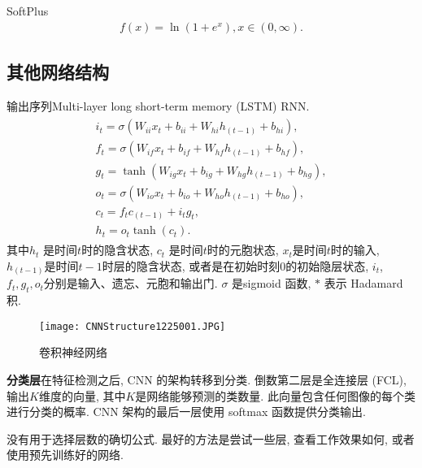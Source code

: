 SoftPlus \cite{glorot2011}
\begin{align}
    f (x)=\ln \left (1+e^{x}\right), x\in (0, \infty).
\end{align}
\subsection{其他网络结构}
输出序列Multi-layer long short-term memory (LSTM) RNN.
\begin{align}
\begin{array}{l}
{i_{t}=\sigma\left (W_{i i} x_{t}+b_{i i}+W_{h i} h_{ (t-1)}+b_{h i}\right)}, \\
{f_{t}=\sigma\left (W_{i f} x_{t}+b_{i f}+W_{h f} h_{ (t-1)}+b_{h f}\right)}, \\
{g_{t}=\tanh \left (W_{i g} x_{t}+b_{i g}+W_{h g} h_{ (t-1)}+b_{h g}\right)}, \\
{o_{t}=\sigma\left (W_{i o} x_{t}+b_{i o}+W_{h o} h_{ (t-1)}+b_{h o}\right)}, \\
{c_{t}=f_{t}  c_{ (t-1)}+i_{t}  g_{t}}, \\
{h_{t}=o_{t}  \tanh \left (c_{t}\right)}.
\end{array}
\end{align}
其中$h_t$ 是时间$t$时的隐含状态, $c_t$ 是时间$t$时的元胞状态, $x_t$是时间$t$时的输入, $h_{(t-1)}$是时间$t-1$时层的隐含状态, 或者是在初始时刻0的初始隐层状态,
$i_t$, $f_t, g_t, o_t$分别是输入、遗忘、元胞和输出门. $\sigma$ 是sigmoid 函数, $*$ 表示 Hadamard 积. 
\begin{figure}[H]
\centering
\texttt{[image: CNNStructure1225001.JPG]}
\vspace{-0.2cm}
\caption{卷积神经网络}
\label{CNNStructure1225001}
\vspace{-0.4cm}
\end{figure}

\textbf{分类层}在特征检测之后, CNN 的架构转移到分类. 倒数第二层是全连接层 (FCL), 输出$K$维度的向量, 其中$K$是网络能够预测的类数量. 此向量包含任何图像的每个类进行分类的概率. CNN 架构的最后一层使用 softmax 函数提供分类输出.

\begin{remark}
    没有用于选择层数的确切公式. 最好的方法是尝试一些层, 查看工作效果如何, 或者使用预先训练好的网络.
\end{remark}

